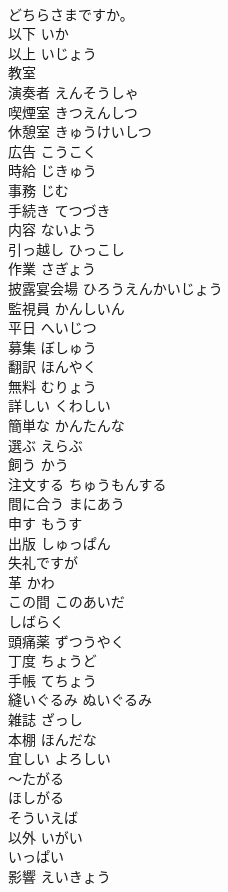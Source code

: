 \documentclass[8pt]{extreport}
\begin{document}
\begin{CJK}{UTF8}{min}
\\	どちらさまですか。		
\\	以下	いか	
\\	以上	いじょう	
\\	教室		
\\	演奏者	えんそうしゃ	
\\	喫煙室	きつえんしつ	
\\	休憩室	きゅうけいしつ	
\\	広告	こうこく	
\\	時給	じきゅう	
\\	事務	じむ	
\\	手続き	てつづき	
\\	内容	ないよう	
\\	引っ越し	ひっこし	
\\	作業	さぎょう	
\\	披露宴会場	ひろうえんかいじょう	
\\	監視員	かんしいん	
\\	平日	へいじつ	
\\	募集	ぼしゅう	
\\	翻訳	ほんやく	
\\	無料	むりょう	
\\	詳しい	くわしい	
\\	簡単な	かんたんな	
\\	選ぶ	えらぶ	
\\	飼う	かう	
\\	注文する	ちゅうもんする	
\\	間に合う	まにあう	
\\	申す	もうす	
\\	出版	しゅっぱん	
\\	失礼ですが		
\\	革	かわ	
\\	この間	このあいだ	
\\	しばらく		
\\	頭痛薬	ずつうやく	
\\	丁度	ちょうど	
\\	手帳	てちょう	
\\	縫いぐるみ	ぬいぐるみ	
\\	雑誌	ざっし	
\\	本棚	ほんだな	
\\	宜しい	よろしい	
\\	～たがる		
\\	ほしがる		
\\	そういえば		
\\	以外	いがい	
\\	いっぱい		
\\	影響	えいきょう	

\end{CJK}
\end{document}
